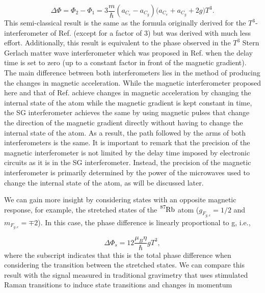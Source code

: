 \documentclass{article}
\begin{document}
\begin{equation}\label{finalphasediff_semiclassical}
    \Delta \Phi= \Phi_2 - \Phi_1 = 3 \frac{m}{\hbar} (a_C_{e} - a_C_{g}) \big( a_C_{e} + a_C_{g} + 2 g \big) T^{3}.
\end{equation}
%
This semi-classical result is the same as the formula originally derived for the $T^{3}$-interferometer of Ref. \cite{Zimmermann2017} (except for a factor of $3$) but was derived with much less effort.
Additionally, this result is equivalent to the phase observed in the $T^{3}$ Stern Gerlach matter wave interferometer which was proposed in Ref. \cite{SG-Interferometer-PhysRevLett.123.083601} when the delay time is set to zero (up to a constant factor in front of the magnetic gradient). The main difference between both interferometers lies in the method of producing the changes in magnetic acceleration. While the magnetic interferometer proposed here and that of Ref. \cite{Zimmermann2017} achieve changes in magnetic acceleration by changing the internal state of the atom while the magnetic gradient is kept constant in time, the SG interferometer achieves the same by using magnetic pulses that change the direction of the magnetic gradient directly without having to change the internal state of the atom. As a result, the path followed by the arms of both interferometers is the same. It is important to remark that the precision of the magnetic interferometer is not limited by the delay time imposed by electronic circuits as it is in the SG interferometer. Instead, the precision of the magnetic interferometer is primarily determined by the power of the microwaves used to change the internal state of the atom, as will be discussed later.

We can gain more insight by considering states with an opposite magnetic response, for example, the stretched states of the $\ce{^{87}_{}Rb}$ atom ($g_{F_{g, e}} = 1/2$ and $m_{F_{g, e}} = \mp 2$). In this case, the phase difference is linearly proportional to g, i.e.,

\begin{equation}\label{semi_classical_phase_example}
    \Delta \Phi_{s} = 12 \frac{\mu_{B} \eta}{ \hbar} g T^{3},
\end{equation}
where the subscript indicates that this is the total phase difference when considering the transition between the stretched states. We can compare this result with the signal measured in traditional gravimetry that uses stimulated Raman transitions to induce state transitions and changes in momentum \cite{Peters_2001}
\end{document}
